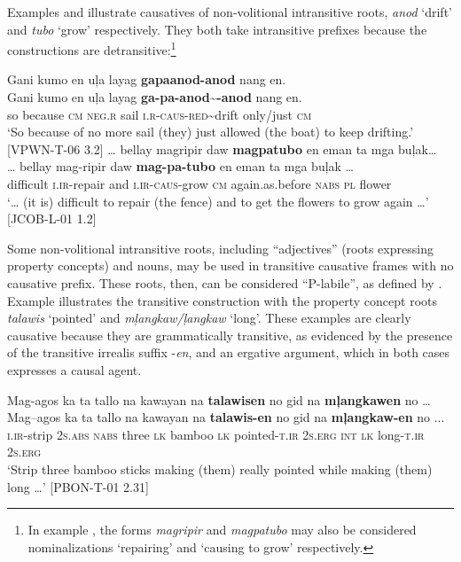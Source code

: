 Examples  and  illustrate causatives of non-volitional intransitive roots, \textit{anod} ‘drift’ and \textit{tubo} ‘grow’ respectively. They both take intransitive prefixes because the constructions are detransitive:\footnote{In example , the forms \textit{magripir} and \textit{magpatubo} may also be considered nominalizations ‘repairing’ and ‘causing to grow’ respectively.}

\ea
\label{bkm:Ref396488032}
Gani  kumo  en  uļa  layag  \textbf{gapaanod-anod}  nang  en. \\\smallskip
\gll Gani  kumo  en  uļa  layag  \textbf{ga-pa-anod\sim{}-anod}  nang  en. \\
so  because  \textsc{cm}  \textsc{neg.r}  sail  \textsc{i.r-caus-red}\sim{}drift  only/just  \textsc{cm} \\
\glt ‘So because of no more sail (they) just allowed (the boat) to keep drifting.’ [VPWN-T-06 3.2]
\z
\ea
\label{bkm:Ref501351430}
 … bellay  magripir  daw  \textbf{magpatubo}  en  eman  ta  mga  buļak… \\\smallskip
\gll … bellay  mag-ripir  daw  \textbf{mag-pa-tubo}  en  eman  ta  mga  buļak … \\
   {} difficult  \textsc{i.ir}-repair  and  \textsc{i.ir-caus}-grow  \textsc{cm}  again.as.before  \textsc{nabs}  \textsc{pl}  flower \\
\glt ‘… (it is) difficult to repair (the fence) and to get the flowers to grow again …’ [JCOB-L-01 1.2]
\z

Some non-volitional intransitive roots, including “adjectives” (roots expressing property concepts) and nouns, may be used in transitive causative frames with no causative prefix. These roots, then, can be considered “P-labile”, as defined by \citet{haspelmath1993}. Example  illustrates the transitive construction with the property concept roots \textit{talawis} ‘pointed’ and \textit{mļangkaw/ļangkaw} ‘long’. These examples are clearly causative because they are grammatically transitive, as evidenced by the presence of the transitive irrealis suffix \nobreakdash-\textit{en}, and an ergative argument, which in both cases expresses a causal agent.

\ea
\label{bkm:Ref395080546}
Mag-agos  ka  ta  tallo  na  kawayan  na  \textbf{talawisen}  no  gid na  \textbf{mļangkawen}  no … \\\smallskip
\gll Mag--agos  ka  ta  tallo  na  kawayan  na  \textbf{talawis-en}  no  gid na  \textbf{mļangkaw-en}  no ... \\
\textsc{i.ir}-strip  2\textsc{s.abs}  \textsc{nabs}  three  \textsc{lk}  bamboo  \textsc{lk}  pointed-\textsc{t.ir} 2\textsc{s.erg} \textsc{int}
\textsc{lk}  long-\textsc{t.ir}  2\textsc{s.erg} \\
\glt `Strip three bamboo sticks making (them) really pointed while making (them) long …’ [PBON-T-01 2.31]
\z

